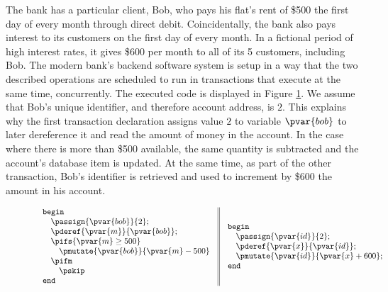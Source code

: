 The bank has a particular client, Bob, who pays his flat's rent of \$500 the first day of every month through direct debit. Coincidentally, the bank also pays interest to its customers on the first day of every month. In a fictional period of high interest rates, it gives \$600 per month to all of its 5 customers, including Bob. The modern bank's backend software system is setup in a way that the two described operations are scheduled to run in transactions that execute at the same time, concurrently. The executed code is displayed in Figure \ref{fig:bobCode}. We assume that Bob's unique identifier, and therefore account address, is $2$. This explains why the first transaction declaration assigns value $2$ to variable $\pvar{bob}$ to later dereference it and read the amount of money in the account. In the case where there is more than \$500 available, the same quantity is subtracted and the account's database item is updated. At the same time, as part of the other transaction, Bob's identifier is retrieved and used to increment by \$600 the amount in his account.
\begin{figure}[h]
	\begin{gather*}
		\begin{array}{c || c}
			\begin{array}{l}
				\mathtt{begin} \\
					\quad \passign{\pvar{bob}}{2}; \\
					\quad \pderef{\pvar{m}}{\pvar{bob}}; \\
					\quad \pifs{\pvar{m} \geq 500} \\
						\quad \quad \pmutate{\pvar{bob}}{\pvar{m} - 500} \\
					\quad \pifm \\
						\quad \quad \pskip \\
				\mathtt{end}
			\end{array}
		&
			\begin{array}{l}
				\mathtt{begin} \\
					\quad \passign{\pvar{id}}{2}; \\
					\quad \pderef{\pvar{x}}{\pvar{id}}; \\
					\quad \pmutate{\pvar{id}}{\pvar{x} + 600}; \\
				\mathtt{end}
			\end{array}
		\end{array}
	\end{gather*}
	\label{fig:bobCode}
\end{figure}

